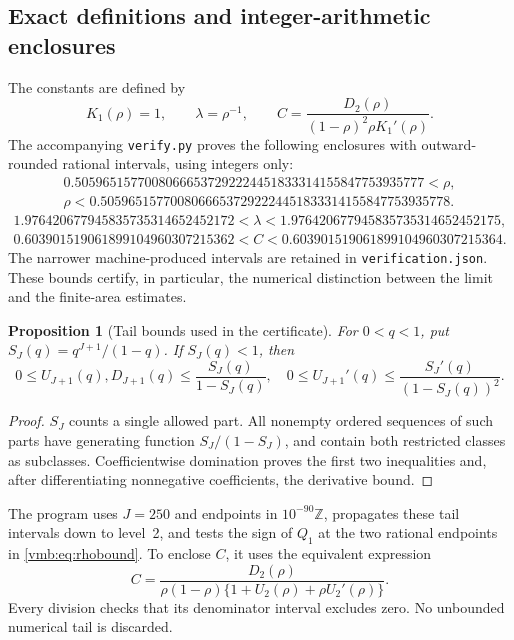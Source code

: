 \documentclass[11pt,a4paper]{article}
\numberwithin{equation}{section}
\newtheorem{proposition}[theorem]{Proposition}
\theoremstyle{definition}\newtheorem{definition}[theorem]{Definition}
\theoremstyle{remark}\newtheorem{remark}[theorem]{Remark}
\begin{document}
\subsection{Exact definitions and integer-arithmetic enclosures}
The constants are defined by
\begin{equation}\label{vmb:eq:constants}
K_1(\rho)=1,
\qquad \lambda=\rho^{-1},
\qquad C=\frac{D_2(\rho)}{(1-\rho)^2\rho K_1'(\rho)}.
\end{equation}
The accompanying \texttt{verify.py} proves the following enclosures with
outward-rounded rational intervals, using integers only:
\begin{equation}\label{vmb:eq:rhobound}
\begin{gathered}
0.50596515770080666537292224451833314155847753935777<\rho,\\
\rho<0.50596515770080666537292224451833314155847753935778.
\end{gathered}
\end{equation}
\begin{gather}
1.976420677945835735314652452172
<\lambda<1.976420677945835735314652452175,
\label{vmb:eq:lambdabound}\\
0.603901519061899104960307215362
<C<0.603901519061899104960307215364.
\label{vmb:eq:Cbound}
\end{gather}
The narrower machine-produced intervals are retained in
\texttt{verification.json}. These bounds certify, in particular, the
numerical distinction between the limit and the finite-area estimates.

\begin{proposition}[Tail bounds used in the certificate]\label{vmb:prop:tail}
For \(0<q<1\), put
\(S_J(q)=q^{J+1}/(1-q)\). If \(S_J(q)<1\), then
\begin{equation}\label{vmb:eq:tails}
0\leq U_{J+1}(q),D_{J+1}(q)\leq\frac{S_J(q)}{1-S_J(q)},
\quad
0\leq U_{J+1}'(q)\leq\frac{S_J'(q)}{(1-S_J(q))^2}.
\end{equation}
\end{proposition}
\begin{proof}
\(S_J\) counts a single allowed part. All nonempty ordered sequences
of such parts have generating function \(S_J/(1-S_J)\), and contain
both restricted classes as subclasses. Coefficientwise domination proves
the first two inequalities and, after differentiating nonnegative
coefficients, the derivative bound.
\end{proof}
The program uses \(J=250\) and endpoints in \(10^{-90}\mathbb Z\),
propagates these tail intervals down to level~2, and tests the sign of
\(Q_1\) at the two rational endpoints in \eqref{vmb:eq:rhobound}.
To enclose \(C\), it uses the equivalent expression
\begin{equation}\label{vmb:eq:Ccertificate}
C=\frac{D_2(\rho)}
{\rho(1-\rho)\{1+U_2(\rho)+\rho U_2'(\rho)\}}.
\end{equation}
Every division checks that its denominator interval excludes zero.
No unbounded numerical tail is discarded.
\end{document}
